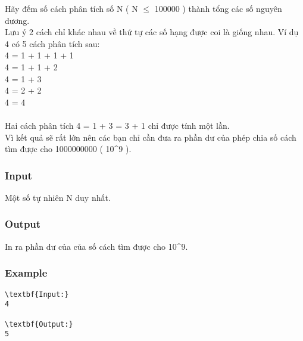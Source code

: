 



   Hãy đếm số cách phân tích số N ( N $\le$ 100000 ) thành tổng các số nguyên dương.   
\\   Lưu ý 2 cách chỉ khác nhau về thứ tự các số hạng được coi là giống nhau. Ví dụ 4 có 5 cách phân tích sau:   
\\   4 = 1 + 1 + 1 + 1   
\\   4 = 1 + 1 + 2   
\\   4 = 1 + 3   
\\   4 = 2 + 2   
\\   4 = 4   
\\
\\   Hai cách phân tích 4 = 1 + 3 = 3 + 1 chỉ được tính một lần.   
\\   Vì kết quả sẽ rất lớn nên các bạn chỉ cần đưa ra phần dư của phép chia số cách tìm được cho 1000000000 ( 10^9 ).  

\subsubsection{   Input  }

   Một số tự nhiên N duy nhất.  

\subsubsection{   Output  }

   In ra phần dư của của số cách tìm được cho 10^9.  

\subsubsection{   Example  }
\begin{verbatim}
\textbf{Input:}
4

\textbf{Output:}
5
\end{verbatim}
